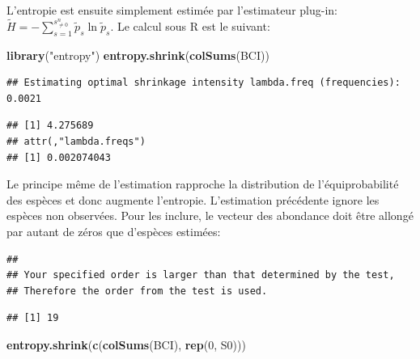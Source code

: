 \documentclass[
  11pt,
  french,
  a4paper,
  extrafontsizes,onecolumn,openright
  ]{memoir}
\newenvironment{Shaded}{\begin{snugshade}}{\end{snugshade}}
\newcommand{\DecValTok}[1]{\textcolor[rgb]{0.00,0.00,0.81}{#1}}
\newcommand{\FunctionTok}[1]{\textcolor[rgb]{0.13,0.29,0.53}{\textbf{#1}}}
\newcommand{\NormalTok}[1]{#1}
\newcommand{\OtherTok}[1]{\textcolor[rgb]{0.56,0.35,0.01}{#1}}
\newcommand{\SpecialCharTok}[1]{\textcolor[rgb]{0.81,0.36,0.00}{\textbf{#1}}}
\newcommand{\StringTok}[1]{\textcolor[rgb]{0.31,0.60,0.02}{#1}}
\begin{document}
L'entropie est ensuite simplement estimée par l'estimateur plug-in: \(\tilde{H} = -\sum^{s^{n}_{\ne 0}}_{s=1}{\tilde{p}_s \ln{\tilde{p}_s}}\).
Le calcul sous R est le suivant:

\scriptsize

\begin{Shaded}
\begin{Highlighting}[]
\FunctionTok{library}\NormalTok{(}\StringTok{"entropy"}\NormalTok{)}
\FunctionTok{entropy.shrink}\NormalTok{(}\FunctionTok{colSums}\NormalTok{(BCI))}
\end{Highlighting}
\end{Shaded}

\begin{verbatim}
## Estimating optimal shrinkage intensity lambda.freq (frequencies): 0.0021
\end{verbatim}

\begin{verbatim}
## [1] 4.275689
## attr(,"lambda.freqs")
## [1] 0.002074043
\end{verbatim}

\normalsize

Le principe même de l'estimation rapproche la distribution de l'équiprobabilité des espèces et donc augmente l'entropie.
L'estimation précédente ignore les espèces non observées.
Pour les inclure, le vecteur des abondance doit être allongé par autant de zéros que d'espèces estimées:

\scriptsize

\begin{Shaded}
\end{Shaded}

\begin{verbatim}
## 
## Your specified order is larger than that determined by the test, 
## Therefore the order from the test is used.
\end{verbatim}

\begin{verbatim}
## [1] 19
\end{verbatim}

\begin{Shaded}
\begin{Highlighting}[]
\FunctionTok{entropy.shrink}\NormalTok{(}\FunctionTok{c}\NormalTok{(}\FunctionTok{colSums}\NormalTok{(BCI), }\FunctionTok{rep}\NormalTok{(}\DecValTok{0}\NormalTok{, S0)))}
\end{Highlighting}
\end{Shaded}
\end{document}
